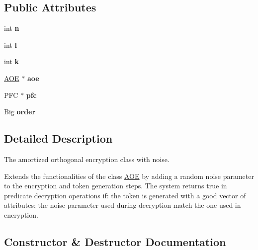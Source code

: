 \subsection*{Public Attributes}
\begin{DoxyCompactItemize}
\item 
int {\bfseries n}\hypertarget{classAOENoise_a9958c324ac317477a9e20eaa619f43c3}{}\label{classAOENoise_a9958c324ac317477a9e20eaa619f43c3}

\item 
int {\bfseries l}\hypertarget{classAOENoise_a69d48da000f6becb069d0ab3bd1bce24}{}\label{classAOENoise_a69d48da000f6becb069d0ab3bd1bce24}

\item 
int {\bfseries k}\hypertarget{classAOENoise_a22d4c6d29fe7846fb4f5b3fe66f407df}{}\label{classAOENoise_a22d4c6d29fe7846fb4f5b3fe66f407df}

\item 
\hyperlink{classAOE}{A\+OE} $\ast$ {\bfseries aoe}\hypertarget{classAOENoise_a2903b460d92f60ce63b98ce26335ef61}{}\label{classAOENoise_a2903b460d92f60ce63b98ce26335ef61}

\item 
P\+FC $\ast$ {\bfseries pfc}\hypertarget{classAOENoise_a5d6f1295dc0bce01e3133c43e489e997}{}\label{classAOENoise_a5d6f1295dc0bce01e3133c43e489e997}

\item 
Big {\bfseries order}\hypertarget{classAOENoise_abaa5eb8029cca74dab0256972b2971dc}{}\label{classAOENoise_abaa5eb8029cca74dab0256972b2971dc}

\end{DoxyCompactItemize}


\subsection{Detailed Description}
The amortized orthogonal encryption class with noise. 

Extends the functionalities of the class \hyperlink{classAOE}{A\+OE} by adding a random noise parameter to the encryption and token generation steps. The system returns true in predicate decryption operations if\+: the token is generated with a good vector of attributes; the noise parameter used during decryption match the one used in encryption. 

\subsection{Constructor \& Destructor Documentation}
